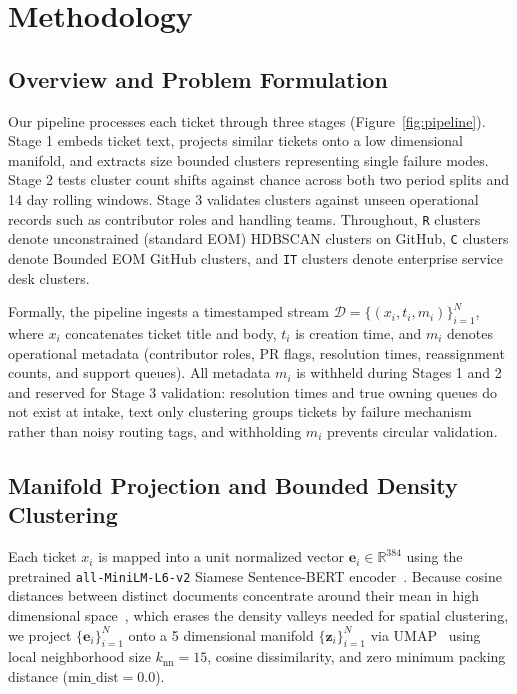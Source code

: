 \documentclass[sigconf,nonacm,pbalance]{acmart}
\begin{document}
\section{Methodology}
\label{sec:method}

\subsection{Overview and Problem Formulation}
Our pipeline processes each ticket through three stages (Figure~\ref{fig:pipeline}). Stage 1 embeds ticket text, projects similar tickets onto a low dimensional manifold, and extracts size bounded clusters representing single failure modes. Stage 2 tests cluster count shifts against chance across both two period splits and 14 day rolling windows. Stage 3 validates clusters against unseen operational records such as contributor roles and handling teams. Throughout, \texttt{R} clusters denote unconstrained (standard EOM) HDBSCAN clusters on GitHub, \texttt{C} clusters denote Bounded EOM GitHub clusters, and \texttt{IT} clusters denote enterprise service desk clusters.

Formally, the pipeline ingests a timestamped stream $\mathcal{D} = \{(x_i, t_i, m_i)\}_{i=1}^{N}$, where $x_i$ concatenates ticket title and body, $t_i$ is creation time, and $m_i$ denotes operational metadata (contributor roles, PR flags, resolution times, reassignment counts, and support queues). All metadata $m_i$ is withheld during Stages 1 and 2 and reserved for Stage 3 validation: resolution times and true owning queues do not exist at intake, text only clustering groups tickets by failure mechanism rather than noisy routing tags, and withholding $m_i$ prevents circular validation.

\subsection{Manifold Projection and Bounded Density Clustering}
Each ticket $x_i$ is mapped into a unit normalized vector $\mathbf{e}_i \in \mathbb{R}^{384}$ using the pretrained \texttt{all-MiniLM-L6-v2} Siamese Sentence-BERT encoder~\cite{reimers2019sentence, wang2020minilm}. Because cosine distances between distinct documents concentrate around their mean in high dimensional space~\cite{beyer1999nearest}, which erases the density valleys needed for spatial clustering, we project $\{\mathbf{e}_i\}_{i=1}^{N}$ onto a 5 dimensional manifold $\{\mathbf{z}_i\}_{i=1}^{N}$ via UMAP~\cite{mcinnes2018umap} using local neighborhood size $k_{\text{nn}} = 15$, cosine dissimilarity, and zero minimum packing distance ($\text{min\_dist} = 0.0$).
\end{document}

